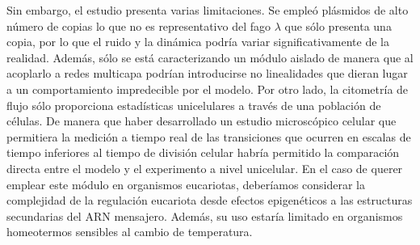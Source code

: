 \documentclass[nochap]{config/ejercicios}
\begin{document}



Sin embargo, el estudio presenta varias limitaciones. Se empleó plásmidos de alto número de copias lo que no es representativo del fago $\lambda$ que sólo presenta una copia, por lo que el ruido y la dinámica podría variar significativamente de la realidad. Además, sólo se está caracterizando un módulo aislado de manera que al acoplarlo a redes multicapa podrían introducirse no linealidades que dieran lugar a un comportamiento impredecible por el modelo. Por otro lado, la citometría de flujo sólo proporciona estadísticas unicelulares a través de una población de células. De manera que haber desarrollado un estudio microscópico celular que permitiera la medición a tiempo real de las transiciones que ocurren en escalas de tiempo inferiores al tiempo de división celular habría permitido la comparación directa entre el modelo y el experimento a nivel unicelular. En el caso de querer emplear este módulo en organismos eucariotas, deberíamos considerar la complejidad de la regulación eucariota desde efectos epigenéticos a las estructuras secundarias del ARN mensajero. Además, su uso estaría limitado en organismos homeotermos sensibles al cambio de temperatura.
\end{document}
